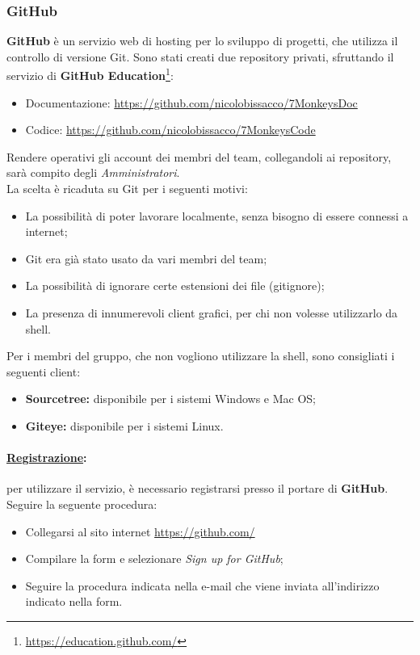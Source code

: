 \subsubsection{GitHub}
\label{github}
\textbf{GitHub} è un servizio web di hosting per lo sviluppo di progetti, che utilizza il controllo di versione Git\g{}. Sono stati creati due repository\g{} privati, sfruttando il servizio di \textbf{GitHub Education}\footnote{\url{https://education.github.com/}}:
\begin{itemize}
\item Documentazione: \url{https://github.com/nicolobissacco/7MonkeysDoc}
\item Codice: \url{https://github.com/nicolobissacco/7MonkeysCode}
\end{itemize}
Rendere operativi gli account dei membri del team, collegandoli ai repository\g{}, sarà compito degli \textit{Amministratori}.\\
La scelta è ricaduta su Git\g{} per i seguenti motivi:
\begin{itemize}
\item La possibilità di poter lavorare localmente, senza bisogno di essere connessi a internet;
\item Git\g{} era già stato usato da vari membri del team;
\item La possibilità di ignorare certe estensioni dei file (gitignore);
\item La presenza di innumerevoli client grafici, per chi non volesse utilizzarlo da shell.
\end{itemize}
Per i membri del gruppo, che non vogliono utilizzare la shell, sono consigliati i seguenti client:
\begin{itemize}
\item \textbf{Sourcetree:} disponibile per i sistemi Windows\g{} e Mac OS\g{};
\item \textbf{Giteye:} disponibile per  i sistemi Linux\g{}.
\end{itemize}

\paragraph{\underline{Registrazione}:} per utilizzare il servizio, è necessario registrarsi presso il portare di \textbf{GitHub}. Seguire la seguente procedura:
\begin{itemize}
\item Collegarsi al sito internet \url{https://github.com/}
\item Compilare la form e selezionare \textit{Sign up for GitHub};
\item Seguire la procedura indicata nella e-mail che viene inviata all'indirizzo indicato nella form.
\end{itemize}

